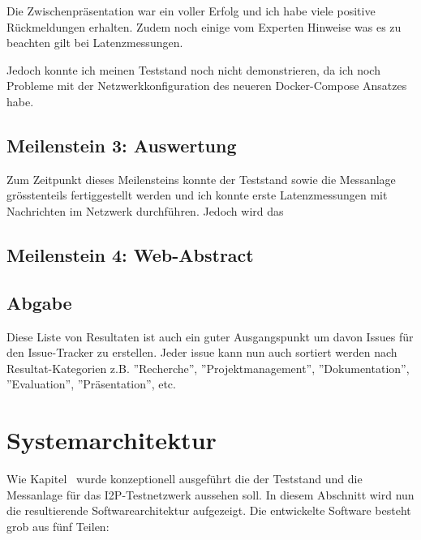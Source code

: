 Die Zwischenpräsentation war ein voller Erfolg und ich habe viele positive Rückmeldungen erhalten.
Zudem noch einige vom Experten Hinweise was es zu beachten gilt bei Latenzmessungen.

Jedoch konnte ich meinen Teststand noch nicht demonstrieren, da ich noch Probleme mit der Netzwerkkonfiguration des neueren Docker-Compose Ansatzes habe.

\subsection{Meilenstein 3: Auswertung}

Zum Zeitpunkt dieses Meilensteins konnte der Teststand sowie die Messanlage grösstenteils fertiggestellt werden und ich konnte erste Latenzmessungen mit Nachrichten im Netzwerk durchführen.
Jedoch wird das 

\subsection{Meilenstein 4: Web-Abstract}

\subsection{Abgabe}
Diese Liste von Resultaten ist auch ein guter Ausgangspunkt um davon Issues für den Issue-Tracker zu erstellen.
Jeder issue kann nun auch sortiert werden nach Resultat-Kategorien z.B. ''Recherche'', ''Projektmanagement'', ''Dokumentation'', ''Evaluation'', ''Präsentation'', etc.

\section{Systemarchitektur}\label{sec:systemarchitektur}

Wie Kapitel~ wurde konzeptionell ausgeführt die der Teststand und die Messanlage für das I2P-Testnetzwerk aussehen soll.
In diesem Abschnitt wird nun die resultierende Softwarearchitektur aufgezeigt.
Die entwickelte Software besteht grob aus fünf Teilen:

